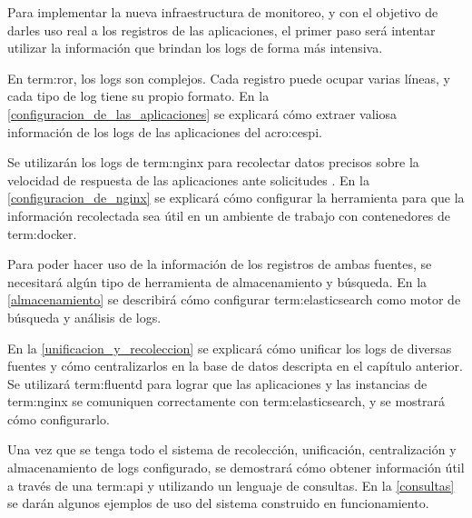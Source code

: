 Para implementar la nueva infraestructura de monitoreo, y con el objetivo de
darles uso real a los registros de las aplicaciones, el primer paso será
intentar utilizar la información que brindan los logs de forma más intensiva.

En \gls{term:ror}, los logs son complejos. Cada registro puede ocupar varias
líneas, y cada tipo de log tiene su propio formato. En la
\autoref{configuracion_de_las_aplicaciones} se explicará cómo extraer valiosa
información de los logs de las aplicaciones del \gls{acro:cespi}.

Se utilizarán los logs de \gls{term:nginx} para recolectar datos precisos sobre
la velocidad de respuesta de las aplicaciones ante solicitudes . En
la \autoref{configuracion_de_nginx} se explicará cómo configurar la herramienta
para que la información recolectada sea útil en un ambiente de trabajo con
contenedores de \gls{term:docker}.

Para poder hacer uso de la información de los registros de ambas fuentes,
se necesitará algún tipo de herramienta de almacenamiento y búsqueda. En la
\autoref{almacenamiento} se describirá cómo configurar \gls{term:elasticsearch}
como motor de búsqueda y análisis de logs.

En la \autoref{unificacion_y_recoleccion} se explicará cómo unificar los logs
de diversas fuentes y cómo centralizarlos en la base de datos descripta en
el capítulo anterior. Se utilizará \gls{term:fluentd} para lograr que las
aplicaciones y las instancias de \gls{term:nginx} se comuniquen correctamente
con \gls{term:elasticsearch}, y se mostrará cómo configurarlo.

Una vez que se tenga todo el sistema de recolección, unificación,
centralización y almacenamiento de logs configurado, se demostrará cómo obtener
información útil a través de una \gls{term:api} y utilizando un lenguaje de
consultas. En la \autoref{consultas} se darán algunos ejemplos de uso del
sistema construido en funcionamiento.
